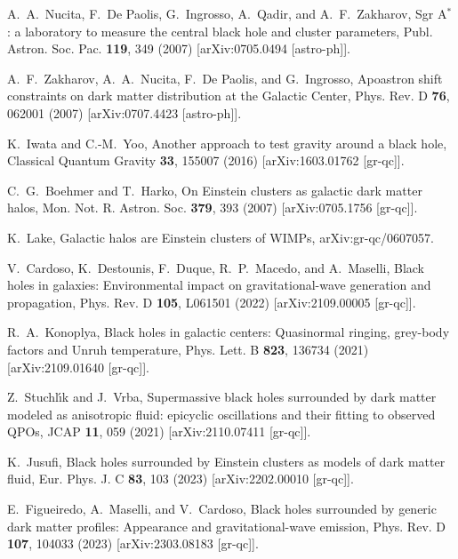 \documentclass[aps,11pt,nofootinbib,preprintnumbers,groupedaddress,superscriptaddress]{revtex4-2}
\begin{document}
\begin{thebibliography}{99}
%
A.~A.~Nucita, F.~De Paolis, G.~Ingrosso, A.~Qadir, and A.~F.~Zakharov,
Sgr A$^*$: a laboratory to measure the central black hole and cluster parameters,
Publ. Astron. Soc. Pac. \textbf{119}, 349 (2007)
[arXiv:0705.0494 [astro-ph]].

%
A.~F.~Zakharov, A.~A.~Nucita, F.~De Paolis, and G.~Ingrosso,
Apoastron shift constraints on dark matter distribution at the Galactic Center,
Phys. Rev. D \textbf{76}, 062001 (2007)
[arXiv:0707.4423 [astro-ph]].


%
K.~Iwata and C.-M.~Yoo,
Another approach to test gravity around a black hole,
Classical Quantum Gravity \textbf{33}, 155007 (2016)
[arXiv:1603.01762 [gr-qc]].

%
C.~G.~Boehmer and T.~Harko,
On Einstein clusters as galactic dark matter halos,
Mon. Not. R. Astron. Soc. \textbf{379}, 393 (2007)
[arXiv:0705.1756 [gr-qc]].

%
K.~Lake,
Galactic halos are Einstein clusters of WIMPs,
arXiv:gr-qc/0607057.

%
V.~Cardoso, K.~Destounis, F.~Duque, R.~P.~Macedo, and A.~Maselli,
Black holes in galaxies: Environmental impact on gravitational-wave generation and propagation,
Phys. Rev. D \textbf{105}, %
L061501 (2022)
[arXiv:2109.00005 [gr-qc]].

%
R.~A.~Konoplya,
Black holes in galactic centers: Quasinormal ringing, grey-body factors and Unruh temperature,
Phys. Lett. B \textbf{823}, 136734 (2021)
[arXiv:2109.01640 [gr-qc]].

%
Z.~Stuchl\'\i{}k and J.~Vrba,
Supermassive black holes surrounded by dark matter modeled as anisotropic fluid: epicyclic oscillations and their fitting to observed QPOs,
JCAP \textbf{11}, %
059 (2021)
[arXiv:2110.07411 [gr-qc]].

%
K.~Jusufi,
Black holes surrounded by Einstein clusters as models of dark matter fluid,
Eur. Phys. J. C \textbf{83}, %
103 (2023)
[arXiv:2202.00010 [gr-qc]].

%
E.~Figueiredo, A.~Maselli, and V.~Cardoso,
Black holes surrounded by generic dark matter profiles: Appearance and gravitational-wave emission,
Phys. Rev. D \textbf{107}, %
104033 (2023)
[arXiv:2303.08183 [gr-qc]].


\end{thebibliography}
\end{document}
